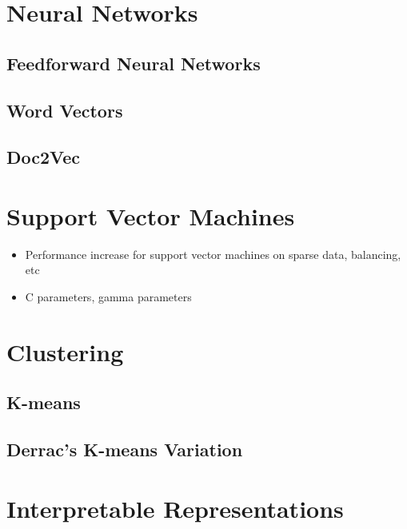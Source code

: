 \section{Neural Networks}



\subsection{Feedforward Neural Networks}

\subsection{Word Vectors}\label{bg:WordVectors}

\subsection{Doc2Vec}




\section{Support Vector Machines}\label{bg:SVM}
\begin{itemize}
	\item Performance increase for support vector machines on sparse data, balancing, etc
	\item C parameters, gamma parameters
\end{itemize}



\section{Clustering}\label{bg:clustering}

\subsection{K-means}

\subsection{Derrac's K-means Variation}

\section{Interpretable Representations}

